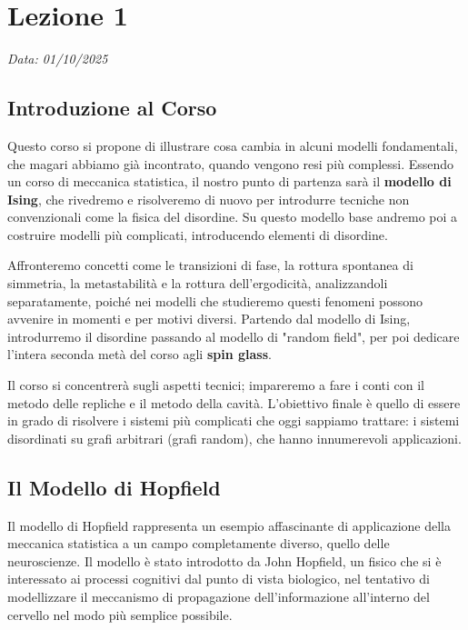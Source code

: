 \chapter{Lezione 1}
\label{chap:lezione_01} 

\begin{flushright}
\textit{Data: 01/10/2025}
\end{flushright}


\section{Introduzione al Corso}
Questo corso si propone di illustrare cosa cambia in alcuni modelli fondamentali, che magari abbiamo già incontrato, quando vengono resi più complessi. Essendo un corso di meccanica statistica, il nostro punto di partenza sarà il \textbf{modello di Ising}, che rivedremo e risolveremo di nuovo per introdurre tecniche non convenzionali come la fisica del disordine. Su questo modello base andremo poi a costruire modelli più complicati, introducendo elementi di disordine.

Affronteremo concetti come le transizioni di fase, la rottura spontanea di simmetria, la metastabilità e la rottura dell'ergodicità, analizzandoli separatamente, poiché nei modelli che studieremo questi fenomeni possono avvenire in momenti e per motivi diversi. Partendo dal modello di Ising, introdurremo il disordine passando al modello di "random field", per poi dedicare l'intera seconda metà del corso agli \textbf{spin glass}.

Il corso si concentrerà sugli aspetti tecnici; impareremo a fare i conti con il metodo delle repliche e il metodo della cavità. L'obiettivo finale è quello di essere in grado di risolvere i sistemi più complicati che oggi sappiamo trattare: i sistemi disordinati su grafi arbitrari (grafi random), che hanno innumerevoli applicazioni.


\section{Il Modello di Hopfield}

Il modello di Hopfield rappresenta un esempio affascinante di applicazione della meccanica statistica a un campo completamente diverso, quello delle neuroscienze. Il modello è stato introdotto da John Hopfield, un fisico che si è interessato ai processi cognitivi dal punto di vista biologico, nel tentativo di modellizzare il meccanismo di propagazione dell'informazione all'interno del cervello nel modo più semplice possibile.


